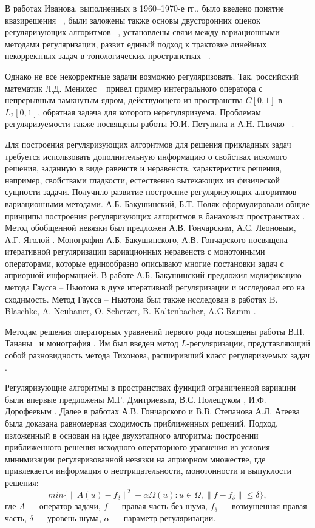 {В работах Иванова, выполненных в 1960--1970-е гг., было введено понятие квазирешения ~\cite{Iv1962_2, Iv1963}, были заложены также основы двусторонних оценок регуляризующих алгоритмов ~\cite{Iv1966}, установлены связи между вариационными методами регуляризации, развит единый подход к трактовке линейных некорректных задач в топологических пространствах ~\cite{Iv1967}. 

Однако не все некорректные задачи возможно регуляризовать. Так, российский математик Л.Д. Менихес ~\cite{Menih1978} привел пример интегрального оператора с непрерывным замкнутым ядром, действующего из пространства \( C[0,1] \) в \( L_2[0,1] \), обратная задача для которого нерегуляризуема. Проблемам регуляризуемости также посвящены работы Ю.И. Петунина и А.Н. Пличко ~\cite{PetPlich1980}.

Для построения регуляризующих алгоритмов для решения прикладных задач требуется использовать дополнительную информацию о свойствах искомого решения, заданную в виде равенств и неравенств, характеристик решения, например, свойствами гладкости, естественно вытекающих из физической сущности задачи. Получило развитие построение регуляризующих алгоритмов вариационными методами. А.Б. Бакушинский, Б.Т. Поляк сформулировали общие принципы построения регуляризующих алгоритмов в банаховых пространствах \cite{BakPol1974}. Метод обобщенной невязки был предложен А.В. Гончарским, А.С. Леоновым, А.Г. Яголой \cite{GonLeoYag1973}.  Монография А.Б. Бакушинского, А.В. Гончарского \cite{BakGon1989} посвящена итеративной регуляризации вариационных неравенств с монотонными операторами, которые единообразно описывают многие постановки задач с априорной информацией. В работе \cite{Bak1992} А.Б. Бакушинский предложил модификацию метода Гаусса -- Ньютона в духе итеративной регуляризации и исследовал его на сходимость. Метод
Гаусса -- Ньютона был также исследован в работах B. Blaschke, A. Neubauer, O. Scherzer, B. Kaltenbacher, A.G.Ramm \cite{BlaNeuSch1997,KalNeuRam2002}.

Методам решения операторных уравнений первого рода посвящены работы В.П. Тананы~\cite{Tan1977, Tan1997} и монография \cite{Tan1981}. Им был введен метод $L$-регуляризации, представляющий собой разновидность метода Тихонова, расширивший класс регуляризуемых задач \cite{Tan2003_1,Tan2003_2}.

Регуляризующие алгоритмы в пространствах функций ограниченной вариации были впервые предложены М.Г. Дмитриевым, В.С. Полещуком \cite{DmiPol1972}, И.Ф. Дорофеевым \cite{Dor1979}. Далее в работах А.В. Гончарского и В.В. Степанова \cite{GonSte1979} А.Л. Агеева \cite{Ag1980} была доказана равномерная сходимость приближенных решений. Подход, изложенный в \cite{TikhGonSteYag1990} основан на идее двухэтапного алгоритма: построении приближенного решения  исходного операторного уравнения из условия минимизации регуляризованной невязки на априорном множестве, где привлекается информация о неотрицательности, монотонности и выпуклости решения: $$min\{\| A(u)-f_\delta\| ^2 + \alpha \Omega(u): u\in\Omega, \|f-f_\delta\|\le\delta \},$$ 
где $A$ --- оператор задачи, $f$ --- правая часть без шума, $f_\delta$ --- возмущенная правая часть, $\delta$ --- уровень шума, $\alpha$ --- параметр регуляризации. 

}
